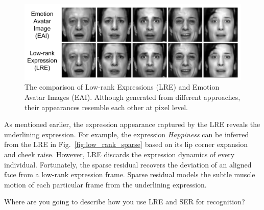 \documentclass[journal]{IEEEtran}
\begin{document}
\begin{figure}[htbp]
	\centering
		\includegraphics[width=\columnwidth]{pics/eai_lre_compare.png}
	\caption{The comparison of Low-rank Expressions (LRE) and Emotion Avatar Images (EAI). Although generated from different approaches, their appearances resemble each other at pixel level.}
	\label{fig:eai_lre_compare}
\end{figure}

As mentioned earlier, the expression appearance captured by the LRE reveals the underlining expression. For example, the expression \textit{Happiness} can be inferred from the LRE in Fig.~\ref{fig:low_rank_sparse} based on its lip corner expansion and cheek raise. However, LRE discards the expression dynamics of every individual. Fortunately, the sparse residual recovers the deviation of an aligned face from a low-rank expression frame. Sparse residual models the subtle muscle motion of each particular frame from the underlining expression. 

\textcolor[rgb]{1,0,0}{Where are you going to describe how you use LRE and SER for recognition?} 
\end{document}
